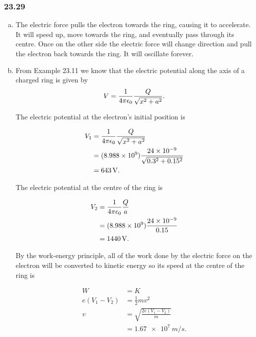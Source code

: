 \documentclass{article}
\begin{document}
\subsubsection{23.29}

\begin{enumerate}[a)]
  \item The electric force pulls the electron towards the ring, causing it to accelerate. It will speed up, move towards the ring, and eventually pass through its centre. Once on the other side the electric force will change direction and pull the electron back towards the ring. It will oscillate forever.

  \item From Example 23.11 we know that the electric potential along the axis of a charged ring is given by \[V = \frac{1}{4 \pi \epsilon_0} \frac{Q}{\sqrt{x^2 + a^2}}.\]

        The electric potential at the electron's initial position is

        \begin{align*}
          V_1 & = \frac{1}{4 \pi \epsilon_0} \frac{Q}{\sqrt{x^2 + a^2}}                            \\
              & = (\num{8.988e9}) \frac{\num{24e-9}}{\sqrt{0.3^2 + 0.15^2}} \\
              & = \qty{643}{V}.
        \end{align*}

        The electric potential at the centre of the ring is

        \begin{align*}
          V_2 & = \frac{1}{4 \pi \epsilon_0} \frac{Q}{a}                          \\
              & = (\num{8.988e9}) \frac{\num{24e-9}}{0.15} \\
              & = \qty{1440}{V}.
        \end{align*}

        By the work-energy principle, all of the work done by the electric force on the electron will be converted to kinetic energy so its speed at the centre of the ring is

        \begin{align*}
          W             & = K                                \\
          e (V_1 - V_2) & = \frac{1}{2} m v^2                \\
          v             & = \sqrt{\frac{2 e (V_1 - V_2)}{m}} \\
                        & = \qty{1.67e7}{m/s}.
        \end{align*}
\end{enumerate}
\end{document}
